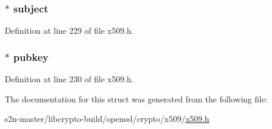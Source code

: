 \subsubsection[{\texorpdfstring{subject}{subject}}]{ $\ast$ subject}\hypertarget{struct_x509__req__info__st_a60e3996b3f3a35c2ce46d97d042d406e}{}\label{struct_x509__req__info__st_a60e3996b3f3a35c2ce46d97d042d406e}


Definition at line 229 of file x509.\+h.

\subsubsection[{\texorpdfstring{pubkey}{pubkey}}]{ $\ast$ pubkey}\hypertarget{struct_x509__req__info__st_a7b1b003230ee0d158404d0ff7a4d120c}{}\label{struct_x509__req__info__st_a7b1b003230ee0d158404d0ff7a4d120c}


Definition at line 230 of file x509.\+h.



The documentation for this struct was generated from the following file\+:\begin{DoxyCompactItemize}
\item 
s2n-\/master/libcrypto-\/build/openssl/crypto/x509/\hyperlink{crypto_2x509_2x509_8h}{x509.\+h}\end{DoxyCompactItemize}
